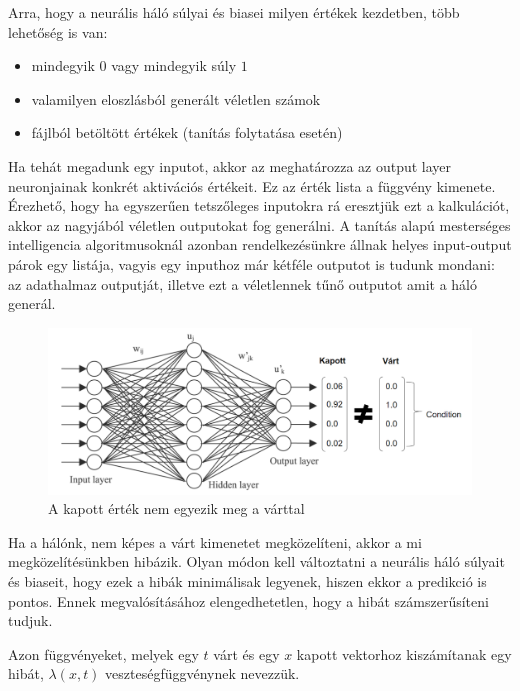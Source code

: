 Arra, hogy a neurális háló súlyai és biasei milyen értékek kezdetben, több lehetőség is van:
\begin{itemize}  
	\item mindegyik $0$ vagy mindegyik súly $1$
	\item valamilyen eloszlásból generált véletlen számok
	\item fájlból betöltött értékek (tanítás folytatása esetén)
\end{itemize}

Ha tehát megadunk egy inputot, akkor az meghatározza az output layer neuronjainak konkrét aktivációs értékeit. Ez az érték lista a függvény kimenete. Érezhető, hogy ha egyszerűen tetszőleges inputokra rá eresztjük ezt a kalkulációt, akkor az nagyjából véletlen outputokat fog generálni. A tanítás alapú mesterséges intelligencia algoritmusoknál azonban rendelkezésünkre állnak helyes input-output párok egy listája, vagyis egy inputhoz már kétféle outputot is tudunk mondani: az adathalmaz outputját, illetve ezt a véletlennek tűnő outputot amit a háló generál.

\begin{figure}[h!]
  
	\begin{center}
	\includegraphics[width=\linewidth]{kapott_vart.png}
	\end{center}
	
  \caption{A kapott érték nem egyezik meg a várttal}
\end{figure}

Ha a hálónk, nem képes a várt kimenetet megközelíteni, akkor a mi megközelítésünkben hibázik. Olyan módon kell változtatni a neurális háló súlyait és biaseit, hogy ezek a hibák minimálisak legyenek, hiszen ekkor a predikció is pontos. Ennek megvalósításához elengedhetetlen, hogy a hibát számszerűsíteni tudjuk.

Azon függvényeket, melyek egy $t$ várt és egy $x$ kapott vektorhoz kiszámítanak egy hibát, $\lambda(x,t)$ veszteségfüggvénynek nevezzük.

